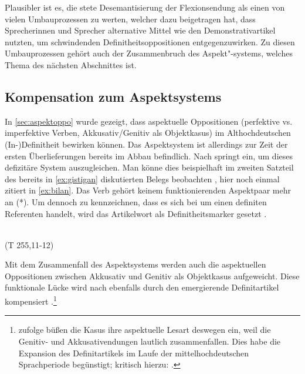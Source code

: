 Plausibler ist es, die stete Desemantisierung der Flexionsendung als einen von vielen Umbauprozessen zu werten, welcher dazu beigetragen hat, dass Sprecherinnen und Sprecher alternative Mittel wie den Demonstrativartikel nutzten, um schwindenden Definitheitsoppositionen entgegenzuwirken. Zu diesen Umbauprozessen gehört auch der Zusammenbruch des Aspekt"-systems, welches Thema des nächsten Abschnittes ist.

\subsection{Kompensation zum Aspektsystems} \label{aspekt}

In \ref{sec:aspektoppo} wurde gezeigt, dass aspektuelle Oppositionen (perfektive vs. imperfektive Verben, Akkusativ/Genitiv als Objektkasus) im Althochdeutschen (In-)Definitheit bewirken können. Das Aspektsystem ist allerdings zur Zeit der ersten Überlieferungen bereits im Abbau befindlich. Nach  \textcite{Leiss1994,Leiss2000,Leiss2010} springt  ein, um dieses defizitäre System auszugleichen. Man könne dies beispielhaft im zweiten Satzteil des bereits in \ref{ex:gistigan} diskutierten Belegs beobachten \parencite[180f.]{Leiss2000}, hier noch einmal zitiert in \ref{ex:bilan}. Das Verb  gehört keinem funktionierenden Aspektpaar mehr an (*). Um dennoch zu kennzeichnen, dass es sich bei  um einen definiten Referenten handelt, wird das Artikelwort  als Definitheitsmarker gesetzt \parencite[181]{Leiss2000}.


\begin{exe}
	\ex \label{ex:bilan}   \\   (T 255,11-12)
\end{exe}
\noindent
Mit dem Zusammenfall des Aspektsystems werden auch die aspektuellen Oppositionen zwischen Akkusativ und Genitiv als Objektkasus aufgeweicht. Diese funktionale Lücke wird nach \textcite[187ff.]{Leiss2000} ebenfalls durch den emergierende Definitartikel kompensiert \parencite[vgl. auch][46f.]{Abraham1997}.\footnote{\textcite[88f.]{Philippi1997} zufolge büßen die Kasus ihre aspektuelle Lesart deswegen ein, weil die Genitiv- und Akkusativendungen lautlich zusammenfallen. Dies habe die Expansion des Definitartikels im Laufe der mittelhochdeutschen Sprachperiode begünstigt; kritisch hierzu: \textcite[234f.]{Lyons1999}.}

